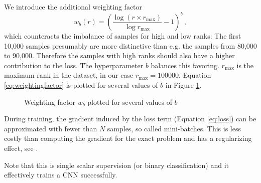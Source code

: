 We introduce the additional weighting factor
\begin{equation}\label{eq:weightingfactor}
    w_b(r)=\left(\frac{\log\left(r\times r_\text{max}\right)}{\log r_\text{max}}-1\right)^b\,,
\end{equation}which counteracts the imbalance of samples for high and low ranks: The first 10,000 samples presumably are more distinctive than e.g. the samples from 80,000 to 90,000. Therefore the samples with high ranks should also have a higher contribution to the loss. The hyperparameter $b$ balances this favoring. $r_\text{max}$ is the maximum rank in the dataset, in our case $r_\text{max}=100000$. Equation \ref{eq:weightingfactor} is plotted for several values of $b$ in Figure \ref{fig:weightingfactor}.

\begin{figure}\centering
    \caption{Weighting factor $w_b$ plotted for several values of $b$}\label{fig:weightingfactor}
\end{figure}

During training, the gradient induced by the loss term (Equation \ref{eq:loss}) can be approximated with fewer than $N$ samples, so called mini-batches. This is less costly than computing the gradient for the exact problem and has a regularizing effect, see \cite{DBLP:journals/corr/KeskarMNST16}.

Note that this is single scalar supervision (or binary classification) and it effectively trains a CNN successfully.

